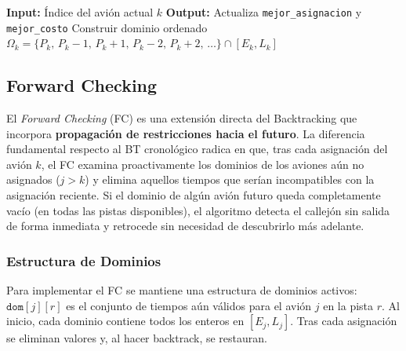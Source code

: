 \documentclass[12pt]{article}
\begin{document}
\begin{algorithm}[H]
\vspace{2mm}
\textbf{Input:} Índice del avión actual $k$\;
\textbf{Output:} Actualiza \texttt{mejor\_asignacion} y \texttt{mejor\_costo}\;
\BlankLine
{}
\BlankLine
{}
\BlankLine
Construir dominio ordenado $\Omega_k = \{P_k,\, P_k{-}1,\, P_k{+}1,\, P_k{-}2,\, P_k{+}2,\, \dots\} \cap [E_k, L_k]$\;
\BlankLine
{}
\vspace{2mm}
\caption{backtracking}
\end{algorithm}

\subsection{Forward Checking}

El \textit{Forward Checking} (FC) es una extensión directa del Backtracking que incorpora \textbf{propagación de restricciones hacia el futuro}. La diferencia fundamental respecto al BT cronológico radica en que, tras cada asignación del avión $k$, el FC examina proactivamente los dominios de los aviones aún no asignados ($j > k$) y elimina aquellos tiempos que serían incompatibles con la asignación reciente. Si el dominio de algún avión futuro queda completamente vacío (en todas las pistas disponibles), el algoritmo detecta el callejón sin salida de forma inmediata y retrocede sin necesidad de descubrirlo más adelante.

\subsubsection{Estructura de Dominios}

Para implementar el FC se mantiene una estructura de dominios activos: $\texttt{dom}[j][r]$ es el conjunto de tiempos aún válidos para el avión $j$ en la pista $r$. Al inicio, cada dominio contiene todos los enteros en $[E_j, L_j]$. Tras cada asignación se eliminan valores y, al hacer backtrack, se restauran.
\end{document}
